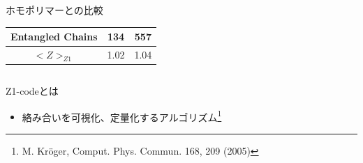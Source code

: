 \documentclass[12pt, dvipdfmx]{beamer}
\begin{document}
\begin{frame}
\begin{columns}[T, onlytextwidth]
\begin{block}{ホモポリマーとの比較}
\begin{center}
\begin{tabular}{c||c|c}
                        Entangled Chains&134&557 \\ \hline
                        \alert{$<Z>_{Z1}$}&\alert{1.02}& \alert{1.04}\\ \hline
                    \end{tabular}
                \end{center}
            \end{block}
        \end{columns}
    \begin{alertblock}{Z1-codeとは}
        \begin{itemize}
            \item 絡み合いを可視化、定量化するアルゴリズム\footnote{
                M. Kröger, Comput. Phys. Commun. 168, 209 (2005)
            }
        \end{itemize}
    \end{alertblock}
\end{frame}
\end{document}
